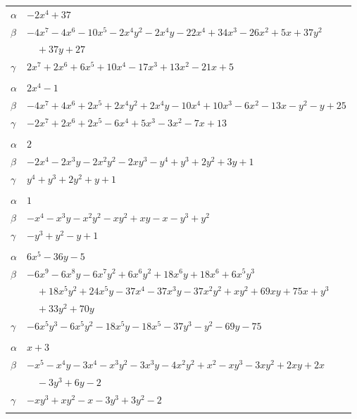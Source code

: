 \documentclass[11pt]{article}
\begin{document}
\begin{longtable}{@{}ll@{}}
$\alpha$ & $-2x^{4}+37$\\
$\beta$ & $-4x^{7}-4x^{6}-10x^{5}-2x^{4}y^{2}-2x^{4}y-22x^{4}+34x^{3}-26x^{2}+5x+37y^{2}$\\
 & $\quad +37y+27$\\
$\gamma$ & $2x^{7}+2x^{6}+6x^{5}+10x^{4}-17x^{3}+13x^{2}-21x+5$\\
\addlinespace[3pt]
\multicolumn{2}{@{}l}{$\{i,j\}=\{5,34\}$, $k_{ij}=3\cdot 7$}\\
$\alpha$ & $2x^{4}-1$\\
$\beta$ & $-4x^{7}+4x^{6}+2x^{5}+2x^{4}y^{2}+2x^{4}y-10x^{4}+10x^{3}-6x^{2}-13x-y^{2}-y+25$\\
$\gamma$ & $-2x^{7}+2x^{6}+2x^{5}-6x^{4}+5x^{3}-3x^{2}-7x+13$\\
\addlinespace[3pt]
\multicolumn{2}{@{}l}{$\{i,j\}=\{6,15\}$, $k_{ij}=2\cdot 5$}\\
$\alpha$ & $2$\\
$\beta$ & $-2x^{4}-2x^{3}y-2x^{2}y^{2}-2xy^{3}-y^{4}+y^{3}+2y^{2}+3y+1$\\
$\gamma$ & $y^{4}+y^{3}+2y^{2}+y+1$\\
\addlinespace[3pt]
\multicolumn{2}{@{}l}{$\{i,j\}=\{6,21\}$, $k_{ij}=5$}\\
$\alpha$ & $1$\\
$\beta$ & $-x^{4}-x^{3}y-x^{2}y^{2}-xy^{2}+xy-x-y^{3}+y^{2}$\\
$\gamma$ & $-y^{3}+y^{2}-y+1$\\
\addlinespace[3pt]
\multicolumn{2}{@{}l}{$\{i,j\}=\{6,23\}$, $k_{ij}=5\cdot 11$}\\
$\alpha$ & $6x^{5}-36y-5$\\
$\beta$ & $-6x^{9}-6x^{8}y-6x^{7}y^{2}+6x^{6}y^{2}+18x^{6}y+18x^{6}+6x^{5}y^{3}$\\
 & $\quad +18x^{5}y^{2}+24x^{5}y-37x^{4}-37x^{3}y-37x^{2}y^{2}+xy^{2}+69xy+75x+y^{3}$\\
 & $\quad +33y^{2}+70y$\\
$\gamma$ & $-6x^{5}y^{3}-6x^{5}y^{2}-18x^{5}y-18x^{5}-37y^{3}-y^{2}-69y-75$\\
\addlinespace[3pt]
\multicolumn{2}{@{}l}{$\{i,j\}=\{6,27\}$, $k_{ij}=2^{3}$}\\
$\alpha$ & $x+3$\\
$\beta$ & $-x^{5}-x^{4}y-3x^{4}-x^{3}y^{2}-3x^{3}y-4x^{2}y^{2}+x^{2}-xy^{3}-3xy^{2}+2xy+2x$\\
 & $\quad -3y^{3}+6y-2$\\
$\gamma$ & $-xy^{3}+xy^{2}-x-3y^{3}+3y^{2}-2$\\
\addlinespace[3pt]

\end{longtable}
\end{document}

